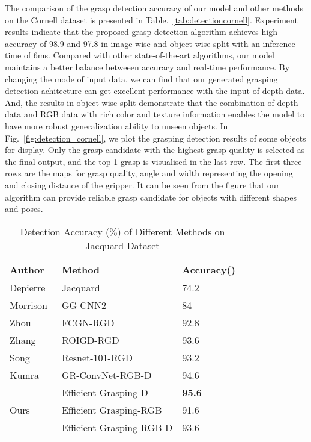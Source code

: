 \documentclass[journal]{IEEEtran}
\begin{document}
The comparison of the grasp detection accuracy of our model and other methods on the Cornell dataset is presented in Table.~\ref{tab:detectioncornell}. Experiment results indicate that the proposed grasp detection algorithm achieves high accuracy of 98.9 and 97.8 in image-wise and object-wise split with an inference time of 6ms. Compared with other state-of-the-art algorithms, our model maintains a better balance betweeen accuracy and real-time performance. By changing the mode of input data, we can find that our generated grasping detection achitecture can get excellent performance with the input of depth data. And, the results in object-wise split demonstrate that the combination of depth data and RGB data with rich color and texture information enables the model to have more robust generalization ability to unseen objects.
In Fig.~\ref{fig:detection_cornell}, we plot the grasping detection results of some objects for display. Only the grasp candidate with the highest grasp quality is selected as the final output, and the top-1 grasp is visualised in the last row. The first three rows are the maps for grasp quality, angle and width representing the opening and closing distance of the gripper. It can be seen from the figure that our algorithm can provide reliable grasp candidate for objects with different shapes and poses.


\begin{table}[htbp]
	\caption{Detection Accuracy (\%) of Different Methods on Jacquard Dataset}
	\begin{center}
		\begin{tabular}{p{40pt}|p{100pt}|p{45pt}}
			\hline
			\textbf{Author}&\textbf{Method}&{\textbf{Accuracy()}}   \\
			\hline
			Depierre~\cite{depierre}&Jacquard& 74.2\\
			Morrison~\cite{ggcnn}&GG-CNN2& 84\\
			Zhou~\cite{zhou}& FCGN-RGD& 92.8\\
			Zhang~\cite{roi}&  ROIGD-RGD& 93.6\\
			Song~\cite{song}& Resnet-101-RGD& 93.2\\
			Kumra~\cite{kumra}& GR-ConvNet-RGB-D& 94.6\\
			\hline
			\multirow{3}{*}{Ours}& Efficient Grasping-D &\textbf{95.6} \\
			&Efficient Grasping-RGB & 91.6\\
			&Efficient Grasping-RGB-D & 93.6\\
			\hline
		\end{tabular}
	\end{center}
	\label{tab:detection_jacquard}
\end{table}
\end{document}
